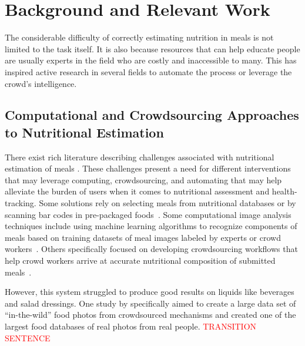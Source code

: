 \vspace{-5pt}
\section{Background and Relevant Work}
The considerable difficulty of correctly estimating nutrition in meals is not limited to the task itself. It is also because resources that can help educate people are usually experts in the field who are costly and inaccessible to many. This has inspired active research in several fields to automate the process or leverage the crowd's intelligence. 

 
\vspace{-5pt}
\subsection{Computational and Crowdsourcing Approaches to Nutritional Estimation}

There exist rich literature describing challenges associated with nutritional estimation of meals \cite{berkman2011low,chandon2007obesity,chaudhry2016evaluation,chaudry2013formative,stanton2006nutrition,kim2014energy,lansky1982estimates,schwartz2006ability}. These challenges present a need for different interventions that may leverage computing, crowdsourcing, and automating that may help alleviate the burden of users when it comes to nutritional assessment and health-tracking. Some solutions rely on selecting meals from nutritional databases or by scanning bar codes in pre-packaged foods~\cite{siek2006we}. Some computational image analysis techniques include using machine learning algorithms to recognize components of meals based on training datasets of meal images labeled by experts or crowd workers~\cite{anthimopoulos2015computer,pouladzadeh2016food,rhyner2016carbohydrate,Thomaz:2013:FIE:2526667.2526672}. 
Others specifically focused on developing crowdsourcing workflows that help crowd workers arrive at accurate nutritional composition of submitted meals~\cite{noronha2011platemate}. 
 
However, this system struggled to produce good results on liquids like beverages and salad dressings. One study by \cite{merler2016snap} specifically aimed to create a large data set of ``in-the-wild'' food photos from crowdsourced mechanisms and created one of the largest food databases of real photos from real people. \textcolor{red}{TRANSITION SENTENCE}


\vspace{-5pt}
